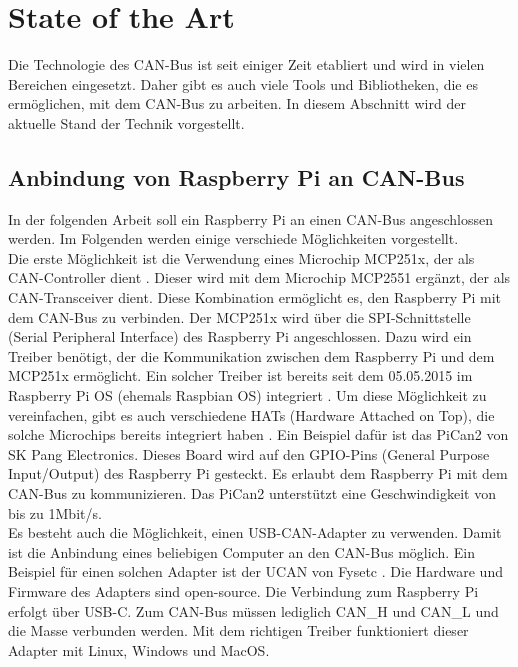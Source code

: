 \section{State of the Art}
Die Technologie des CAN-Bus ist seit einiger Zeit etabliert und wird in vielen Bereichen eingesetzt.
Daher gibt es auch viele Tools und Bibliotheken, die es ermöglichen, mit dem CAN-Bus zu arbeiten.
In diesem Abschnitt wird der aktuelle Stand der Technik vorgestellt.

\subsection{Anbindung von Raspberry Pi an CAN-Bus}
In der folgenden Arbeit soll ein Raspberry Pi an einen CAN-Bus angeschlossen werden. 
Im Folgenden werden einige verschiede Möglichkeiten vorgestellt.\\
Die erste Möglichkeit ist die Verwendung eines Microchip MCP251x, der als CAN-Controller dient \cite{Salunkhe2016}. Dieser wird 
mit dem Microchip MCP2551 ergänzt, der als CAN-Transceiver dient. Diese Kombination ermöglicht es, den
Raspberry Pi mit dem CAN-Bus zu verbinden. Der MCP251x wird über die SPI-Schnittstelle (Serial Peripheral Interface) 
des Raspberry Pi angeschlossen. Dazu wird ein Treiber benötigt, der die Kommunikation zwischen dem Raspberry Pi und dem
MCP251x ermöglicht. Ein solcher Treiber ist bereits seit dem 05.05.2015 im Raspberry Pi OS (ehemals Raspbian OS)
integriert \cite{Salunkhe2016}. 
Um diese Möglichkeit zu vereinfachen, gibt es auch verschiedene HATs (Hardware Attached on Top), die solche Microchips
bereits integriert haben \cite{Pant2019}. Ein Beispiel dafür ist das PiCan2 von SK Pang Electronics. Dieses Board wird auf den 
GPIO-Pins (General Purpose Input/Output) des Raspberry Pi gesteckt. Es erlaubt dem Raspberry Pi mit dem CAN-Bus
zu kommunizieren. Das PiCan2 unterstützt eine Geschwindigkeit von bis zu 1Mbit/s. \\
Es besteht auch die Möglichkeit, einen USB-CAN-Adapter zu verwenden. Damit ist die Anbindung eines 
beliebigen Computer an den CAN-Bus möglich.
Ein Beispiel für einen solchen Adapter ist der UCAN von Fysetc \cite{FysetcUCAN}. 
Die Hardware und Firmware des Adapters
sind open-source. Die Verbindung zum Raspberry Pi erfolgt über USB-C.
Zum CAN-Bus müssen lediglich CAN\_H und CAN\_L und die Masse verbunden werden. Mit dem richtigen Treiber funktioniert
dieser Adapter mit Linux, Windows und MacOS.  



